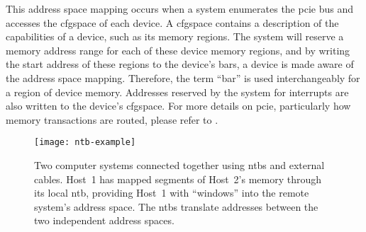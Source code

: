 This address space mapping occurs when a system enumerates the \gls{pcie} bus and accesses the \gls{cfgspace} of each device.
%
A \gls{cfgspace} contains a description of the capabilities of a device, such as its memory regions.
%
The system will reserve a memory address range for each of these device memory regions, and by writing the start address of these regions to the device's \glspl{bar}, a device is made aware of the address space mapping.
%
Therefore, the term ``\gls{bar}'' is used interchangeably for a region of device memory.
%
Addresses reserved by the system for interrupts are also written to the device's \gls{cfgspace}.
%
For more details on \gls{pcie}, particularly how memory transactions are routed, please refer to .



\begin{figure}
    \centering
    \texttt{[image: ntb-example]}
    \caption[Two computer systems connected using , and the  translate between the two different address domains]
    {Two computer systems connected together using \glspl{ntb} and external cables. Host~1 has mapped \glspl{segment} of Host~2's memory through its local \gls{ntb}, providing Host~1 with ``windows'' into the remote system's address space. The \glspl{ntb} translate addresses between the two independent address spaces.}
    \label{fig:ntb-example}
\end{figure}



